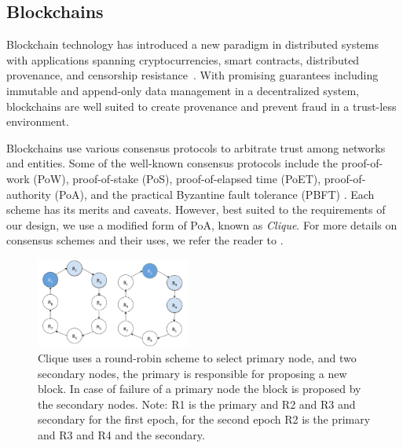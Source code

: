 \documentclass[conference]{IEEEtran}
\newcommand{\rc}{{{\em RouteChain}}\xspace}
\begin{document}
\subsection{Blockchains} \label{sec:BC}
Blockchain technology has introduced a new paradigm in distributed systems with applications spanning cryptocurrencies, smart contracts, distributed provenance, and censorship resistance~\cite{NeisseSN17,Omohundro14,GovernatoriIMRS18,AhmadSBM18}. With promising guarantees including immutable and append-only data management in a decentralized system, blockchains are well suited to create provenance and prevent fraud in a trust-less environment. 

Blockchains use various consensus protocols to arbitrate trust among networks and entities. Some of the well-known consensus protocols include the proof-of-work (PoW), proof-of-stake (PoS), proof-of-elapsed time (PoET), proof-of-authority (PoA), and the practical Byzantine fault tolerance (PBFT) \cite{SaadM18,SaadNKM18}. Each scheme has its merits and caveats. However, best suited to the requirements of our design, we use a modified form of PoA, known as {\em Clique}. For more details on consensus schemes and their uses, we refer the reader to \cite{Bano:2017b}.




\begin{figure}[t]
\centering
\includegraphics[width=0.45\textwidth]{fig/bgp_clique_roundrobin.pdf}
\caption{Clique uses a round-robin scheme to select primary node, and two secondary nodes, the primary is responsible for proposing a new block. In case of failure of a primary node the block is proposed by the secondary nodes. Note: R1 is the primary and R2 and R3 and secondary for the first epoch, for the second epoch R2 is the primary and R3 and R4 and the secondary. }
\label{fig:Clique}
\end{figure}
\end{document}

